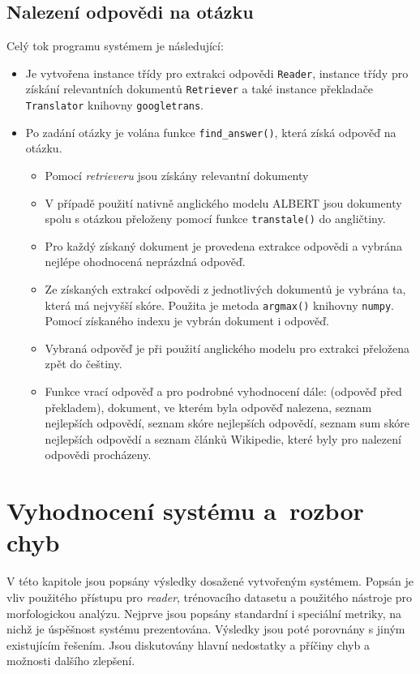 \section*{Nalezení odpovědi na otázku}
Celý tok programu systémem je následující:
\begin{itemize}
    \item Je vytvořena instance třídy pro extrakci odpovědi \texttt{Reader}, instance třídy pro získání relevantních dokumentů \texttt{Retriever} a také instance překladače \texttt{Translator} knihovny \texttt{googletrans}.
    
    \item Po zadání otázky je volána funkce \texttt{find\_answer()}, která získá odpověď na otázku.
    \begin{itemize}
        \item Pomocí \emph{retrieveru} jsou získány relevantní dokumenty
        \item V případě použití nativně anglického modelu ALBERT jsou dokumenty spolu s otázkou přeloženy pomocí funkce \texttt{transtale()} do angličtiny.
        \item Pro každý získaný dokument je provedena extrakce odpovědi a vybrána nejlépe ohodnocená neprázdná odpověď.
        \item Ze získaných extrakcí odpovědi z jednotlivých dokumentů je vybrána ta, která má nejvyšší skóre. Použita je metoda \texttt{argmax()} knihovny \texttt{numpy}. Pomocí získaného indexu je vybrán dokument i odpověď.
        \item Vybraná odpověď je při použití anglického modelu pro extrakci přeložena zpět do češtiny.
        \item Funkce vrací odpověď a pro podrobné vyhodnocení dále: (odpověď před překladem), dokument, ve kterém byla odpověď nalezena, seznam nejlepších odpovědí, seznam skóre nejlepších odpovědí, seznam sum skóre nejlepších odpovědí a seznam článků Wikipedie, které byly pro nalezení odpovědi procházeny.
    \end{itemize}
\end{itemize}



\chapter{Vyhodnocení systému a~rozbor chyb}
\label{system_evaluation}
V této kapitole jsou popsány výsledky dosažené vytvořeným systémem. Popsán je vliv použitého přístupu pro \emph{reader}, trénovacího datasetu a použitého nástroje pro morfologickou analýzu. Nejprve jsou popsány standardní i speciální metriky, na nichž je úspěšnost systému prezentována. Výsledky jsou poté porovnány s jiným existujícím řešením. Jsou diskutovány hlavní nedostatky a příčiny chyb a možnosti dalšího zlepšení.


